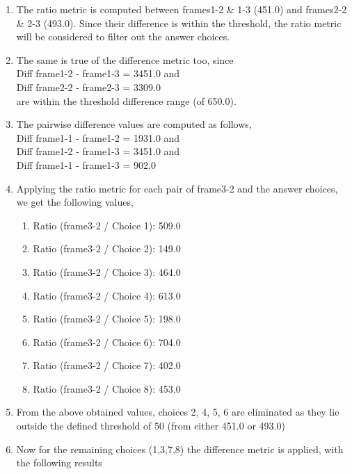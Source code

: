 \documentclass[10pt, letter]{article}
\begin{document}
\begin{enumerate}
\item The ratio metric is computed between frames1-2 \& 1-3 (451.0) and frames2-2 \& 2-3 (493.0). Since their difference is within the threshold, the ratio metric will be considered to filter out the answer choices.
\item The same is true of the difference metric too, since \\
	\hspace*{3cm}Diff frame1-2 - frame1-3 = 3451.0 and \\
	\hspace*{3cm}Diff frame2-2 - frame2-3 = 3309.0\\
	are within the threshold difference range (of 650.0).
\item The pairwise difference values are computed as follows, \\
	\hspace*{3cm}Diff frame1-1 - frame1-2 = 1931.0 and \\
	\hspace*{3cm}Diff frame1-2 - frame1-3 = 3451.0 and \\
	\hspace*{3cm}Diff frame1-1 - frame1-3 = 902.0
\item Applying the ratio metric for each pair of frame3-2 and the answer choices, we get the following values,
	\begin{enumerate}
		\item Ratio (frame3-2 / Choice 1): 509.0
		\item Ratio (frame3-2 / Choice 2): 149.0
		\item Ratio (frame3-2 / Choice 3): 464.0
		\item Ratio (frame3-2 / Choice 4): 613.0
		\item Ratio (frame3-2 / Choice 5): 198.0
		\item Ratio (frame3-2 / Choice 6): 704.0
		\item Ratio (frame3-2 / Choice 7): 402.0
		\item Ratio (frame3-2 / Choice 8): 453.0
		\end{enumerate}
\item From the above obtained values, choices 2, 4, 5, 6 are eliminated as they lie outside the defined threshold of 50 (from either 451.0 or 493.0)
\item Now for the remaining choices (1,3,7,8) the difference metric is applied, with the following results
	\begin{enumerate}

\end{enumerate}
\end{enumerate}
\end{document}
